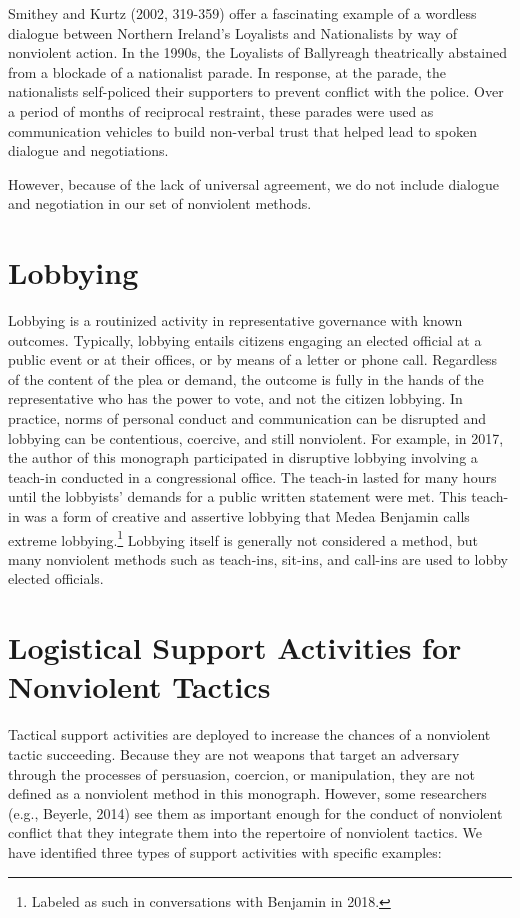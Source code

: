 \documentclass[twoside,a4paper,12pt,fleqn,openany]{extbook}
\begin{document}
Smithey and Kurtz (2002, 319-359) offer a fascinating example of a wordless dialogue between Northern Ireland’s Loyalists and Nationalists by way of nonviolent action. In the 1990s, the Loyalists of Ballyreagh theatrically abstained from a blockade of a nationalist parade. In response, at the parade, the nationalists self-policed their supporters to prevent conflict with the police. Over a period of months of reciprocal restraint, these parades were used as communication vehicles to build non-verbal trust that helped lead to spoken dialogue
and negotiations.

However, because of the lack of universal agreement, we do not include dialogue and negotiation in our set of nonviolent methods.

\section*{Lobbying}

Lobbying is a routinized activity in representative governance with known outcomes. Typically, lobbying entails citizens engaging an elected official at a public event or at their offices, or by means of a letter or phone call. Regardless of the content of the plea or demand, the outcome is fully in the hands of the representative who has the power to vote, and not the citizen lobbying. In practice, norms of personal conduct and communication can be disrupted and lobbying can be contentious, coercive, and still nonviolent. For example, in 2017, the author of this monograph participated in disruptive lobbying involving a teach-in conducted in a congressional office. The teach-in lasted for many hours until the lobbyists’ demands for a public written statement were met. This teach-in was a form of creative and assertive lobbying that Medea Benjamin calls extreme lobbying.\footnote{Labeled as such in conversations with Benjamin in 2018.} Lobbying itself is generally not considered a method, but many nonviolent methods such as teach-ins, sit-ins, and call-ins are used to lobby elected officials.

\section*{Logistical Support Activities for Nonviolent Tactics}

Tactical support activities are deployed to increase the chances of a nonviolent tactic succeeding. Because they are not weapons that target an adversary through the processes of persuasion, coercion, or manipulation, they are not defined as a nonviolent method in this monograph. However, some researchers (e.g., Beyerle, 2014) see them as important enough for the conduct of nonviolent conflict that they integrate them into the repertoire of nonviolent tactics. We have identified three types of support activities with specific examples:
\end{document}

